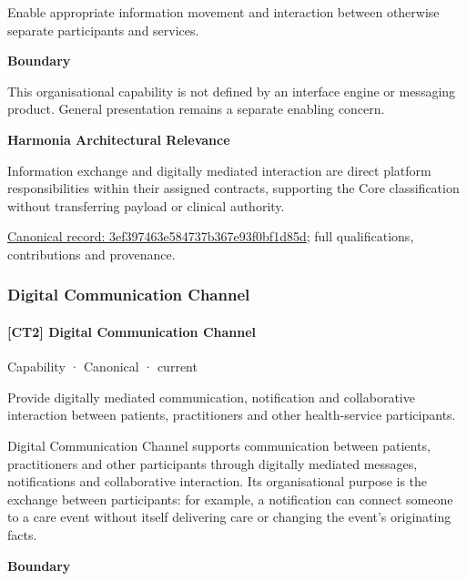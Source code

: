 Enable appropriate information movement and interaction between otherwise separate participants and services.



\textbf{Boundary}



This organisational capability is not defined by an interface engine or messaging product. General presentation remains a separate enabling concern.



\textbf{Harmonia Architectural Relevance}



Information exchange and digitally mediated interaction are direct platform responsibilities within their assigned contracts, supporting the Core classification without transferring payload or clinical authority.


{\footnotesize \href{../../../../continuum/strategy/capability/3ef397463e584737b367e93f0bf1d85d.md}{Canonical record: 3ef397463e584737b367e93f0bf1d85d}; full qualifications, contributions and provenance.}\par
\subsubsection{Digital Communication Channel}

\paragraph{[CT2] Digital Communication Channel}

\label{element:f5defe141228490598115fe41db89bd7}
{\small Capability · Canonical · current}\par

Provide digitally mediated communication, notification and collaborative interaction between patients, practitioners and other health-service participants.



Digital Communication Channel supports communication between patients, practitioners and other participants through digitally mediated messages, notifications and collaborative interaction. Its organisational purpose is the exchange between participants: for example, a notification can connect someone to a care event without itself delivering care or changing the event's originating facts.



\textbf{Boundary}




